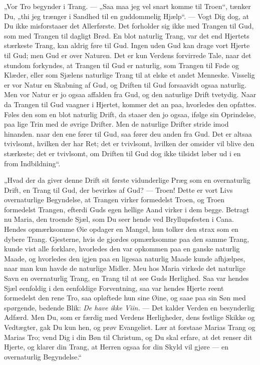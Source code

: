 \documentclass[12pt,a4paper]{book}
\begin{document}
„Vor Tro begynder i Trang. --- „Saa maa jeg vel snart komme til Troen“, tænker Du, „thi jeg
trænger i Sandhed til en guddommelig Hjælp“. --- Vogt Dig dog, at Du ikke misforstaaer det
Allerførste. Det forholder sig ikke med Trangen til
Gud, som med Trangen til dagligt Brød. En blot naturlig Trang, var det end Hjertets
stærkeste Trang, kan aldrig føre til Gud. Ingen uden Gud kan drage vort Hjerte til Gud; men
Gud er over Naturen. Det er kun Verdens forvirrede Tale, naar det stundom forkyndes, at
Trangen til Gud er naturlig, som Trangen til Føde og Klæder, eller som Sjælens naturlige
Trang til at elske et andet Menneske. Visselig er vor Natur en Skabning af Gud, og Driften
til Gud forsaavidt ogsaa naturlig. Men vor Natur er jo ogsaa affalden fra Gud, og den
naturlige Drift tvetydig. Naar da Trangen til Gud vaagner i Hjertet, kommer det an paa,
hvorledes den opfattes. Føles den som en blot naturlig Drift, da staaer den jo ogsaa,
ifølge sin Oprindelse, paa lige Trin med de øvrige Drifter. Men de naturlige Drifter stride
imod hinanden. naar den ene fører til Gud, saa fører deu anden fra Gud. Det er altsaa
tvivlsomt, hvilken der har Ret; det er tvivlsomt, hvilken der omsider vil blive den
stærkeste; det er tvivlsomt, om Driften til Gud dog ikke tilsidst løber ud i en from
Indbildning“.

„Hvad der da giver denne Drift sit første vidunderlige Præg som en overnaturlig Drift, en
Trang til Gud, der bevirkes af Gud? --- Troen! Dette er vort Livs overnaturlige Begyndelse,
at Trangen virker formedelst Troen, og Troen formedelst Trangen, efterdi Guds egen hellige
Aand virker i dem begge. Betragt nu Maria, den troende Sjæl, som Du seer hende ved
Bryllupsfesten i Cana. Hendes opmærksomme Øie opdager en Mangel, hun tolker den strax som
en dybere Trang. Gjesterne, hvis de gjordes opmærksomme paa den samme Trang, kunde vist
alle forklare, hvorledes den var opkommen paa en ganske naturlig Maade, og hvorledes den
igjen paa en ligesaa naturlig Maade kunde afhjælpes, naar man kun havde de naturlige
Midler. Meu hos Maria virkede det naturlige Savn en overnaturlig Trang, en Trang til at
see Guds Herlighed. Saa var hendes Sjæl eenfoldig i den eenfoldige Forventning, saa var
hendes Hjerte reent formedelst den rene Tro, saa opløftede hun sine Øine, og saae paa sin
Søn med spørgende, bedende Blik: \emph{De have ikke Viin.} --- Det kalder Verden en
besynderlig Adfærd. Men Du, som er færdig med Verdens Herligheder, dens festlige Skikke og
Vedtægter, gak Du kun hen, og prøv Evangeliet. Lær at forstaae Marias Trang og Marias Tro;
vend Dig i din Bøn til Christum, og Du skal erfare, at det renser dit Hjerte, og klarer din
Trang, at Herren ogsaa for din Skyld vil gjøre --- en overnaturlig Begyndelse.“
\end{document}
